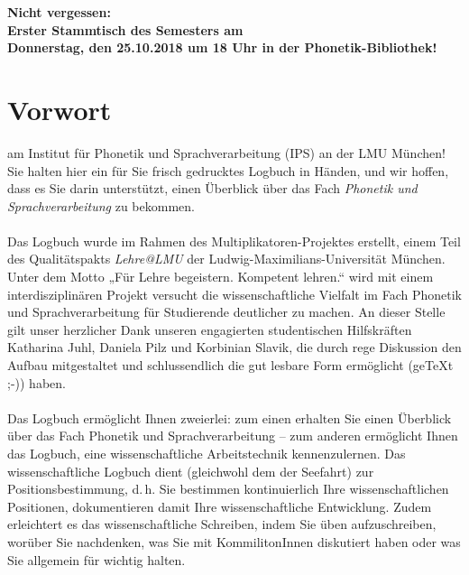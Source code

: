 \documentclass[11pt]{book}
\begin{document}
\begin{titlepage}
\begin{center}
\newpage

\textbf {Nicht vergessen:\\Erster Stammtisch des Semesters am\\Donnerstag, den 25.10.2018 um 18 Uhr in der Phonetik-Bibliothek!}

\end{center}
\end{titlepage}
\thispagestyle{empty}
\tableofcontents

\chapter*{Vorwort}
 am Institut für Phonetik und Sprachverarbeitung (IPS) an der LMU München!
Sie halten hier ein für Sie frisch gedrucktes Logbuch in Händen, und wir hoffen, dass es Sie darin unterstützt, einen Überblick über das Fach \emph{Phonetik und Sprachverarbeitung} zu bekommen.\\
\\
Das Logbuch wurde im Rahmen des Multiplikatoren-Projektes erstellt, einem Teil des Qualitätspakts \emph{Lehre@LMU} der Ludwig-Maximilians-Universität München. Unter dem Motto „Für Lehre begeistern. Kompetent lehren.“ wird mit einem interdisziplinären Projekt versucht die wissenschaftliche Vielfalt im Fach Phonetik und Sprachverarbeitung für Studierende deutlicher zu machen. An dieser Stelle gilt unser herzlicher Dank unseren engagierten studentischen Hilfskräften Katharina Juhl, Daniela Pilz und Korbinian Slavik, die durch rege Diskussion den Aufbau mitgestaltet und schlussendlich die gut lesbare Form ermöglicht (ge\TeX{}t ;-)) haben.\\
\\
Das Logbuch ermöglicht Ihnen zweierlei: zum einen erhalten Sie einen Überblick über das Fach Phonetik und Sprachverarbeitung – zum anderen ermöglicht Ihnen das Logbuch, eine wissenschaftliche Arbeitstechnik kennenzulernen. Das wissenschaftliche Logbuch dient (gleichwohl dem der Seefahrt) zur Positionsbestimmung, d.\,h. Sie bestimmen kontinuierlich Ihre wissenschaftlichen Positionen, dokumentieren damit Ihre wissenschaftliche Entwicklung. Zudem erleichtert es das wissenschaftliche Schreiben, indem Sie üben aufzuschreiben, worüber Sie nachdenken, was Sie mit KommilitonInnen diskutiert haben oder was Sie allgemein für wichtig halten.\\
\\
\end{document}
